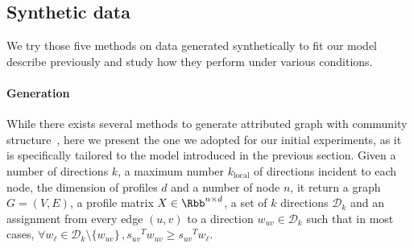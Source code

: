 \subsection{Synthetic data}
\label{ssec:edge_synth}

We try those five methods on data generated synthetically to fit our model describe previously and
study how they perform under various conditions.

\paragraph{Generation}
\label{par:edge_generation}

While there exists several methods to generate attributed graph with community
structure~\autocites{Yang2013}{XuBayesian14}{Kataoka2016}, here we present the one we adopted for
our initial experiments, as it is specifically tailored to the model introduced in the previous
section. Given a number of directions $k$, a maximum number $k_\mathrm{local}$ of directions
incident to each node, the dimension of profiles $d$ and a number of node $n$, it return a graph
$G=(V,E)$, a profile matrix $X\in \Rbb^{n\times d}$, a set of $k$ directions $\mathcal{D}_k$ and an
assignment from every edge $(u,v)$ to a direction $w_{uv} \in \mathcal{D}_k$ such that in most
cases, $\forall w_\ell \in \mathcal{D}_k \setminus \{w_{uv}\}\,, {s_{uv}}^T w_{uv} \geq  {s_{uv}}^T
w_\ell$.


